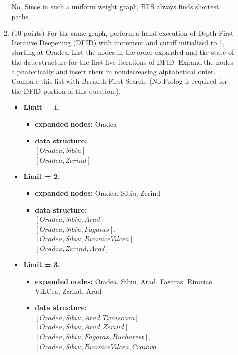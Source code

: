 \documentclass{article}%
\begin{document}
\begin{enumerate}
\begin{enumerate}
	No. Since in such a uniform weight graph, BFS always finds shortest paths.
	
	\item (10 points) For the same graph, perform a hand-execution of Depth-First Iterative Deepening (DFID) with increment and cutoff initialized to 1, starting at Oradea. List the nodes in the order expanded and the state of the data structure for the first five iterations of DFID. Expand the nodes alphabetically and insert them in nondecreasing alphabetical order. Compare this list with Breadth-First Search. (No Prolog is required for the DFID portion of this question.).\\
		\begin{itemize}
		\item \textbf{Limit = 1.} 
			\begin{itemize}
			\item \textbf{expanded nodes:} Oradea
			\item \textbf{data structure:} \\
			$\left[ Oradea , Sibiu \right]$\\
			$\left[ Oradea, Zerind\right]$ 
			\end{itemize}
		\item \textbf{Limit = 2.} 
			\begin{itemize}
			\item \textbf{expanded nodes:} Oradea, Sibiu, Zerind
			\item \textbf{data structure:} \\
			$\left[ Oradea, Sibiu, Arad \right]$\\
			$ \left[ Oradea, Sibiu, Fagaras \right],$ \\ 
			$ \left[ Oradea, Sibiu, Rimnice Vilcea \right]$\\ 
			$\left[ Oradea, Zerind, Arad\right] $ 
			\end{itemize}
		\item \textbf{Limit = 3.} 
			\begin{itemize}
			\item \textbf{expanded nodes:} Oradea, Sibiu, Arad, Fagaras, Rimnice ViLCea, Zerind, Arad, 
			\item \textbf{data structure:} \\
			$\left[ Oradea, Sibiu, Arad,Timisoara \right]$ \\ 
			$\left[ Oradea, Sibiu, Arad,Zerind \right]$ \\ 
			$ \left[ Oradea, Sibiu, Fagaras, Bucharest \right],$ \\ 
			$ \left[ Oradea, Sibiu, Rimnice Vilcea, Craiova \right]$\\

\end{itemize}
\end{itemize}
\end{enumerate}
\end{enumerate}
\end{document}
